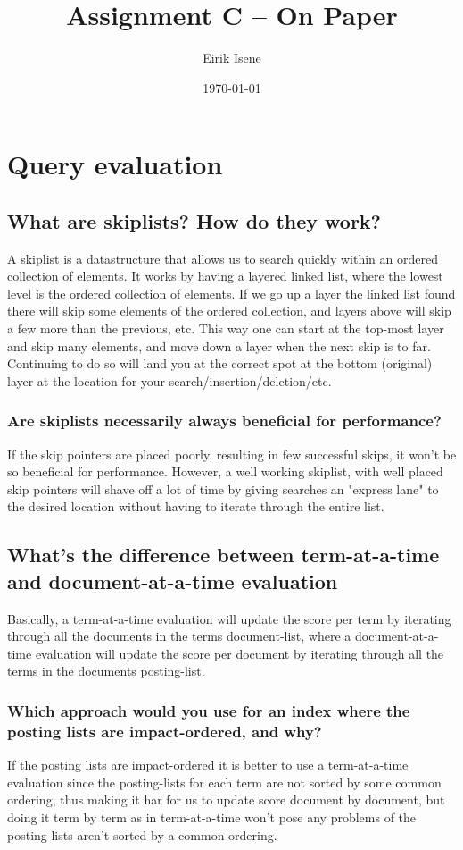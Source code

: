 \documentclass{article}
\title{Assignment C -- On Paper}
\author{Eirik Isene}
\date{\today}
\begin{document}
\maketitle

\section{Query evaluation}

	\subsection{What are skiplists? How do they work?}
	A skiplist is a datastructure that allows us to search quickly within an ordered collection of elements. It works by having a layered linked list, where the lowest level is the ordered collection of elements. If we go up a layer the linked list found there will skip some elements of the ordered collection, and layers above will skip a few more than the previous, etc. This way one can start at the top-most layer and skip many elements, and move down a layer when the next skip is to far. Continuing to do so will land you at the correct spot at the bottom (original) layer at the location for your search/insertion/deletion/etc.
		\subsubsection{Are skiplists necessarily always beneficial for performance?}
		If the skip pointers are placed poorly, resulting in few successful skips, it won't be so beneficial for performance. However, a well working skiplist, with well placed skip pointers will shave off a lot of time by giving searches an "express lane" to the desired location without having to iterate through the entire list.

	\subsection{What's the difference between term-at-a-time and document-at-a-time evaluation}
	Basically, a term-at-a-time evaluation will update the score per term by iterating through all the documents in the terms document-list, where a document-at-a-time evaluation will update the score per document by iterating through all the terms in the documents posting-list.
		\subsubsection{Which approach would you use for an index where the posting lists are impact-ordered, and why?}
		If the posting lists are impact-ordered it is better to use a term-at-a-time evaluation since the posting-lists for each term are not sorted by some common ordering, thus making it har for us to update score document by document, but doing it term by term as in term-at-a-time won't pose any problems of the posting-lists aren't sorted by a common ordering.
\end{document}
